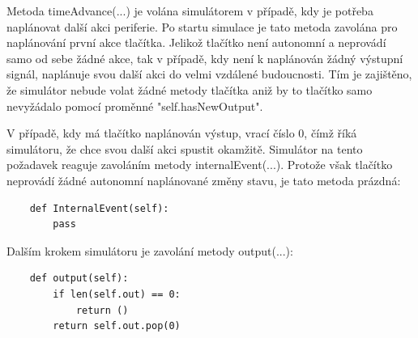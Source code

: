 Metoda timeAdvance(...) je volána simulátorem v případě, kdy je potřeba naplánovat další akci periferie. Po startu simulace je tato metoda zavolána pro naplánování první akce tlačítka. Jelikož tlačítko není autonomní a neprovádí samo od sebe žádné akce, tak v případě, kdy není k naplánován žádný výstupní signál, naplánuje svou další akci do velmi vzdálené budoucnosti. Tím je zajištěno, že simulátor nebude volat žádné metody tlačítka aniž by to tlačítko samo nevyžádalo pomocí proměnné "self.hasNewOutput".

V případě, kdy má tlačítko naplánován výstup, vrací číslo 0, čímž říká simulátoru, že chce svou další akci spustit okamžitě. Simulátor na tento požadavek reaguje zavoláním metody internalEvent(...). Protože však tlačítko neprovádí žádné autonomní naplánované změny stavu, je tato metoda prázdná:

\begin{lstlisting}
	def InternalEvent(self):
		pass
\end{lstlisting}

Dalším krokem simulátoru je zavolání metody output(...):

\begin{lstlisting}
	def output(self):
		if len(self.out) == 0:
			return ()
		return self.out.pop(0)
\end{lstlisting}

